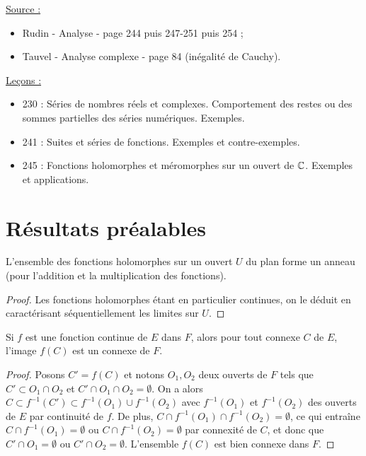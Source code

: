 

\newcommand{\Hol}{\mathcal{H}}
\newcommand{\gast}{\gamma^{\ast}}
\DeclareMathOperator{\Ind}{Ind}

\pagestyle{fancy}

\fancyhead[R]{}



\underline{Source :} 
\begin{itemize}
\item Rudin - Analyse - page 244 puis 247-251 puis 254 ;
\item Tauvel - Analyse complexe - page 84 (inégalité de Cauchy).
\end{itemize}


\underline{Leçons :}
\begin{itemize}
\item
    230 : Séries de nombres réels et complexes. Comportement des restes ou des sommes partielles des séries numériques. Exemples.
\item
    241 : Suites et séries de fonctions. Exemples et contre-exemples.
\item
    245 : Fonctions holomorphes et méromorphes sur un ouvert de $\mathbb{C}$. Exemples et applications.

\end{itemize}

\section{Résultats préalables}

\begin{lem}
L'ensemble des fonctions holomorphes sur un ouvert $U$ du plan forme un anneau 
(pour l'addition et la multiplication des fonctions).
\end{lem}

\begin{proof}
Les fonctions holomorphes étant en particulier continues, on le déduit en caractérisant séquentiellement les limites sur $U$.
\end{proof}

\begin{lem}
Si $f$ est une fonction continue de $E$ dans $F$, alors pour tout connexe $C$ de $E$, l'image $f(C)$ est un connexe de $F$.
\end{lem}

\begin{proof}
Posons $C'=f(C)$ et notons $O_1, O_2$ deux ouverts de $F$ tels que $C' \subset O_1 \cap O_2$ 
et $C' \cap O_1 \cap O_2 = \emptyset$. 
On a alors $C \subset f^{-1}(C') \subset f^{-1}(O_1) \cup f^{-1}(O_2)$ avec $ f^{-1}(O_1)$ et $f^{-1}(O_2)$ des ouverts de $E$ par
continuité de $f$. De plus, $C \cap  f^{-1}(O_1) \cap f^{-1}(O_2) = \emptyset$, ce qui entraîne $C \cap  f^{-1}(O_1) = \emptyset$ ou
$C \cap f^{-1}(O_2) = \emptyset$ par connexité de $C$, et donc que $C' \cap O_1 = \emptyset$ ou $C' \cap O_2 = \emptyset$.
L'ensemble $f(C)$ est bien connexe dans $F$.
\end{proof}

